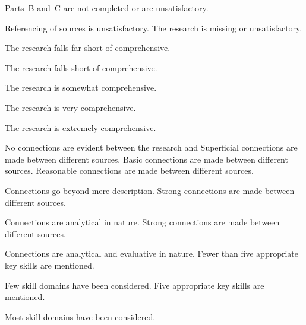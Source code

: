 \documentclass{../../fal_assignment}
\begin{document}
\begin{markingrubric}
		\grade\fail Parts~B and~C are not completed or are unsatisfactory.
			\par Referencing of sources is unsatisfactory.
        \grade \fail The research is missing or unsatisfactory.
        	\par 
        \grade The research falls far short of comprehensive.
        	\par 
        \grade The research falls short of comprehensive.
        	\par 
        \grade The research is somewhat comprehensive.
        	\par 
	\grade The research is very comprehensive.
        	\par 
	\grade The research is extremely comprehensive.
        	\par 
        \grade\fail No connections are evident between the research and 
        \grade		Superficial connections are made between different sources.
        \grade		Basic connections are made between different sources.
        \grade		Reasonable connections are made between different sources.
        \par		Connections go beyond mere description.
        \grade		Strong connections are made between different sources.
        \par		Connections are analytical in nature.
        \grade		Strong connections are made between different sources.
        \par		Connections are analytical and evaluative in nature.
        \grade \fail  	Fewer than five appropriate key skills are mentioned.
         \par 		Few skill domains have been considered.
        \grade 		Five appropriate key skills are mentioned.
        \par 		Most skill domains have been considered.

\end{markingrubric}
\end{document}
